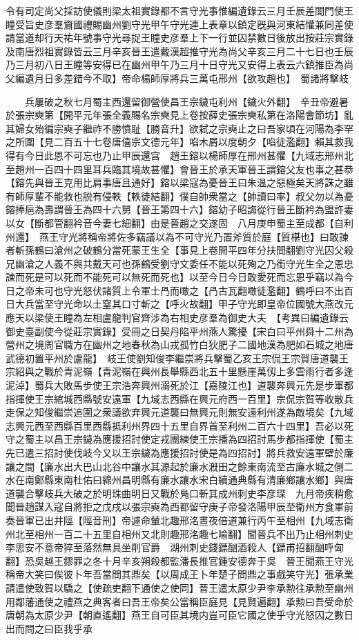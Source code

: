 令有司定尚父採訪使儀則梁太祖實錄都不言守光事惟編遺錄云三月壬辰差閤門使王瞳受旨史彦羣齎國禮賜幽州劉守光甲午守光連上表章以鎮定旣與河東結懽兼同差使請當道却行天祐年號事守光尋捉王瞳史彦羣上下一行並囚禁數日後放出按莊宗實錄及南唐烈祖實錄皆云三月辛亥晉王遣戴漢超推守光為尚父辛亥三月二十七日也壬辰乃三月初八日王瞳等安得已在幽州甲午乃三月十日守光又安得上表云六鎮推臣為尚父編遺月日多差錯今不取】帝命楊師厚將兵三萬屯邢州【欲攻趙也】　蜀諸將擊岐

　　兵屢破之秋七月蜀主西還留御營使昌王宗鐬屯利州【鐬火外翻】　辛丑帝避暑於張宗奭第【開平元年張全義賜名宗奭見上卷按薛史張宗奭私第在洛陽會節坊】亂其婦女殆徧宗奭子繼祚不勝憤耻【勝音升】欲弑之宗奭止之曰吾家頃在河陽為李罕之所圍【見二百五十七卷唐僖宗文德元年】啗木屑以度朝夕【啗徒濫翻】賴其救我得有今日此恩不可忘也乃止甲辰還宫　趙王鎔以楊師厚在邢州甚懼【九域志邢州北至趙州一百四十四里耳兵臨其境故甚懼】會晉王於承天軍晉王謂鎔父友也事之甚恭【鎔先與晉王克用比肩事唐且通好】鎔以梁寇為憂晉王曰朱温之惡極矣天將誅之雖有師厚輩不能救也脱有侵軼【軼徒結翻】僕自帥衆當之【帥讀曰率】叔父勿以為憂鎔捧巵為壽謂晉王為四十六舅【晉王第四十六】鎔幼子昭誨從行晉王斷衿為盟許妻以女【斷都管翻衿音今妻七細翻】由是晉趙之交遂固　八月庚申蜀主至成都【自利州還】　燕王守光將稱帝將佐多竊議以為不可守光乃置斧質於庭【質椹也】曰敢諫者斬孫鶴曰滄州之破鶴分當死蒙王生全【事見上卷開平四年分扶問翻劉守光囚父殺兄幽滄之人義不與共戴天可也孫鶴受劉守文委任不能以死殉之乃銜守光生全之恩忠諫而死是可以死而不能死可以無死而死也】以至今日今日敢愛死而忘恩乎竊以為今日之帝未可也守光怒伏諸質上令軍士冎而噉之【冎古瓦翻噉徒濫翻】鶴呼曰不出百日大兵當至守光命以土窒其口寸斬之【呼火故翻】甲子守光即皇帝位國號大燕改元應天以梁使王瞳為左相盧龍判官齊涉為右相史彦羣為御史大夫　【考異曰編遺錄云御史臺副使今從莊宗實錄】受冊之日契丹陷平州燕人驚擾【宋白曰平州舜十二州為營州之境周官職方在幽州之地春秋為山戎孤竹白狄肥子二國地漢為肥如石城之地唐武德初置平州於盧龍】　岐王使劉知俊李繼崇將兵擊蜀乙亥王宗侃王宗賀唐道襲王宗紹與之戰於青泥嶺【青泥嶺在興州長舉縣西北五十里懸崖萬仭上多雲雨行者多逢泥淖】蜀兵大敗馬步使王宗浩奔興州溺死於江【嘉陵江也】道襲奔興元先是步軍都指揮使王宗綰城西縣號安遠軍【九域志西縣在興元府西一百里】宗侃宗賀等收散兵走保之知俊繼崇追圍之衆議欲弃興元道襲曰無興元則無安遠利州遂為敵境矣【九域志興元西至西縣百里西縣抵利州界四十五里自界首至利州二百六十四里】吾必以死守之蜀主以昌王宗鐬為應援招討使定戎團練使王宗播為四招討馬步都指揮使【蜀主先已遣三招討使伐岐今又以王宗鐬為應援招討使是為四招討】將兵救安遠軍壁於廉讓之間【廉水出大巴山北谷中讓水其源起於廉水漑田之餘東南流至古廉水城之側二水在南鄭縣東南杜佑曰綿州昌明縣有廉水讓水宋白續通典縣有清廉鄉讓水鄉】與唐道襲合擊岐兵大破之於明珠曲明日又戰於鳬口斬其成州刺史李彦琛　九月帝疾稍愈聞晉趙謀入寇自將拒之戊戌以張宗奭為西都留守庚子帝發洛陽甲辰至衛州方食軍前奏晉軍已出井陘【陘音刑】帝遽命輦北趣邢洺晝夜倍道兼行丙午至相州【九域志衛州北至相州一百二十五里自相州又北則趣邢洺趣七喻翻】聞晉兵不出乃止相州刺史李思安不意帝猝至落然無具坐削官爵　湖州刺史錢鏢酗酒殺人【鏢甫招翻酗呼匈翻】恐吳越王鏐罪之冬十月辛亥朔殺都監潘長推官鍾安德奔于吳　晉王聞燕王守光稱帝大笑曰俟彼卜年吾當問其鼎矣【以周成王卜年楚子問鼎之事戲笑守光】張承業請遣使致賀以驕之【使疏吏翻下通使之使同】晉王遣太原少尹李承勲往承勲至幽州用鄰藩通使之禮燕之典客者曰吾王帝矣公當稱臣庭見【見賢遍翻】承勲曰吾受命於唐朝為太原少尹【朝直遙翻】燕王自可臣其境内豈可臣它國之使乎守光怒囚之數日出而問之曰臣我乎承